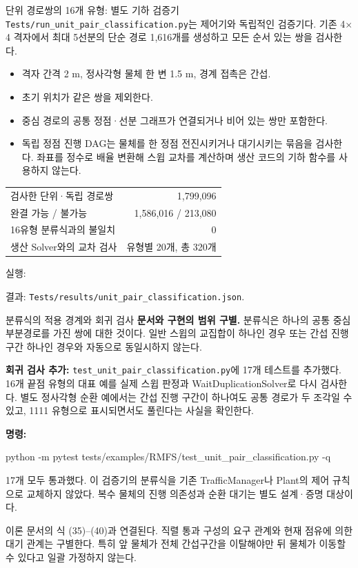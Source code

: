 \begin{frame}{단위 경로쌍의 16개 유형: 별도 기하 검증기}
\small
\texttt{Tests/run\_unit\_pair\_classification.py}는 제어기와 독립적인 검증기다.
기존 4$\times$4 격자에서 최대 5선분의 단순 경로 1,616개를 생성하고 모든 순서 있는 쌍을 검사한다.
\begin{itemize}
\item 격자 간격 2 m, 정사각형 물체 한 변 1.5 m, 경계 접촉은 간섭.
\item 초기 위치가 같은 쌍을 제외한다.
\item 중심 경로의 공통 정점·선분 그래프가 연결되거나 비어 있는 쌍만 포함한다.
\item 독립 정점 진행 DAG는 물체를 한 정점 전진시키거나 대기시키는 묶음을 검사한다.
좌표를 정수로 배율 변환해 스윕 교차를 계산하며 생산 코드의 기하 함수를 사용하지 않는다.
\end{itemize}
\begin{center}\begin{tabular}{lr}\toprule
검사한 단위·독립 경로쌍 & 1,799,096\\
완결 가능 / 불가능 & 1,586,016 / 213,080\\
16유형 분류식과의 불일치 & 0\\
생산 Solver와의 교차 검사 & 유형별 20개, 총 320개\\\bottomrule
\end{tabular}\end{center}
\footnotesize 실행:\par
\texttt{}\par
결과: \texttt{Tests/results/unit\_pair\_classification.json}.
\end{frame}

\begin{frame}{분류식의 적용 경계와 회귀 검사}
\small
\textbf{문서와 구현의 범위 구별.} 분류식은 하나의 공통 중심 부분경로를 가진 쌍에 대한 것이다.
일반 스윕의 교집합이 하나인 경우 또는 간섭 진행 구간 하나인 경우와 자동으로 동일시하지 않는다.
\par\medskip
\textbf{회귀 검사 추가:} \texttt{test\_unit\_pair\_classification.py}에 17개 테스트를 추가했다.
16개 끝점 유형의 대표 예를 실제 스윕 판정과 WaitDuplicationSolver로 다시 검사한다.
별도 정사각형 순환 예에서는 간섭 진행 구간이 하나여도 공통 경로가 두 조각일 수 있고,
1111 유형으로 표시되면서도 풀린다는 사실을 확인한다.
\par\medskip
\textbf{명령:}\par
{\scriptsize\ttfamily python -m pytest tests/examples/RMFS/test\_unit\_pair\_classification.py -q}
\par\medskip
17개 모두 통과했다. 이 검증기의 분류식을 기존 TrafficManager나 Plant의 제어 규칙으로
교체하지 않았다. 복수 물체의 진행 의존성과 순환 대기는 별도 설계·증명 대상이다.
\par\medskip\footnotesize
이론 문서의 식 (35)--(40)과 연결된다.
직렬 통과 구성의 요구 관계와 현재 점유에 의한 대기 관계는 구별한다.
특히 앞 물체가 전체 간섭구간을 이탈해야만 뒤 물체가 이동할 수 있다고 일괄 가정하지 않는다.
\end{frame}


